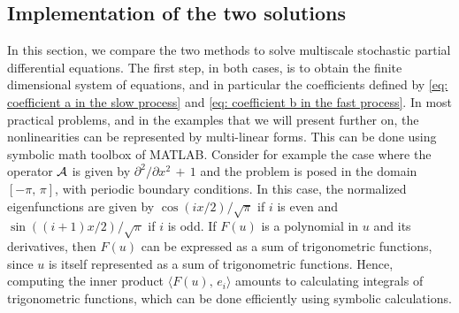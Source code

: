 \subsection{Implementation of the two solutions} 
\label{sec: Implementation of the two solutions}
In this section, we compare the two methods to solve multiscale stochastic partial differential equations.
The first step, in both cases, is to obtain the finite dimensional system of equations, and in particular the coefficients defined by \cref{eq: coefficient a in the slow process} and \cref{eq: coefficient b in the fast process}.
In most practical problems, and in the examples that we will present further on,  the nonlinearities can be represented by multi-linear forms.
This can be done using symbolic math toolbox of MATLAB. 
Consider for example the case where the operator $\mathcal A$ is given by ${\partial}^2/{\partial}x^2 \,+\,1$ and the problem is posed in the domain $[-{\pi},\,{\pi}]$, with periodic boundary conditions.
In this case, the normalized eigenfunctions are given by $\cos(ix/2)/\sqrt{\pi}$ if $i$ is even and $\sin((i+1)x/2)/\sqrt{\pi}$ if $i$ is odd.
If $F(u)$ is a polynomial in $u$ and its derivatives, then $F(u)$ can be expressed as a sum of trigonometric functions, since $u$ is itself represented as a sum of trigonometric functions.
Hence, computing the inner product $\langle F(u),\, e_i \rangle$ amounts to
calculating integrals of trigonometric functions, which can be done efficiently using symbolic calculations.

